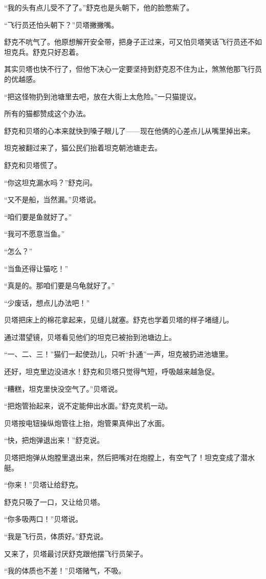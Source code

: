 \documentclass[a4paper,12pt,UTF8,twoside]{ctexbook}
\begin{document}
“我的头有点儿受不了了。”舒克也是头朝下，他的脸憋紫了。

“飞行员还怕头朝下？”贝塔撇撇嘴。

舒克不吭气了。他原想解开安全带，把身子正过来，可又怕贝塔笑话飞行员还不如坦克兵。舒克只好忍着。

其实贝塔也快不行了，但他下决心一定要坚持到舒克忍不住为止，煞煞他那飞行员的优越感。

“把这怪物扔到池塘里去吧，放在大街上太危险。”一只猫提议。

所有的猫都赞成这个办法。

舒克和贝塔的心本来就快到嗓子眼儿了——现在他俩的心差点儿从嘴里掉出来。

坦克被翻过来了，猫公民们抬着坦克朝池塘走去。

舒克和贝塔慌了。

“你这坦克漏水吗？”舒克问。

“又不是船，当然漏。”贝塔说。

“咱们要是鱼就好了。”

“我可不愿意当鱼。”

“怎么？”

“当鱼还得让猫吃！”

“真是的。那咱们要是乌龟就好了。”

“少废话，想点儿办法吧！”

贝塔把床上的棉花拿起来，见缝儿就塞。舒克也学着贝塔的样子堵缝儿。

通过潜望镜，贝塔看见他们的坦克已被抬到池塘边上。

“一、二、三！”猫们一起使劲儿，只听“扑通”一声，坦克被扔进池塘里。

还好，坦克里边没进水！舒克和贝塔只觉得气短，呼吸越来越急促。

“糟糕，坦克里快没空气了。”贝塔说。

“把炮管抬起来，说不定能伸出水面。”舒克灵机一动。

贝塔按电钮操纵炮管往上抬，炮管果真伸出了水面。

“快，把炮弹退出来！”舒克说。

贝塔把炮弹从炮膛里退出来，然后把嘴对在炮膛上，有空气了！坦克变成了潜水艇。

“你来！”贝塔让给舒克。

舒克只吸了一口，又让给贝塔。

“你多吸两口！”贝塔说。

“我是飞行员，体质好。”舒克说。

又来了，贝塔最讨厌舒克跟他摆飞行员架子。

“我的体质也不差！”贝塔赌气，不吸。
\end{document}
